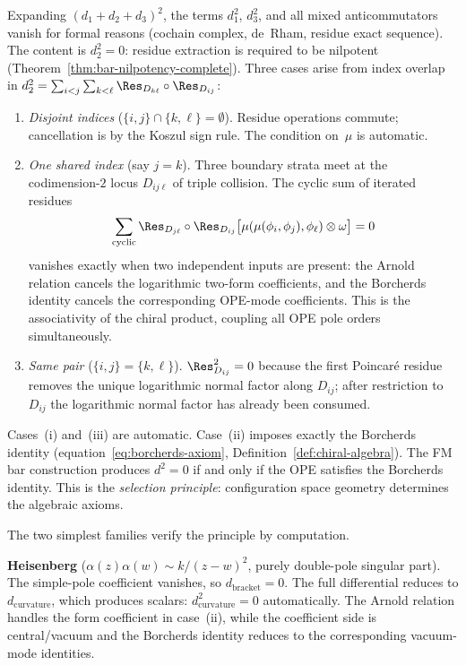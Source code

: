 \noindent
Expanding $(d_1 + d_2 + d_3)^2$, the terms
$d_1^2$, $d_3^2$, and all mixed anticommutators vanish
for formal reasons (cochain complex, de~Rham,
residue exact sequence). The content is
$d_2^2 = 0$: residue extraction is required to be nilpotent
(Theorem~\ref{thm:bar-nilpotency-complete}).
Three cases arise from index overlap in
$d_2^2 = \sum_{i<j}\sum_{k<\ell}
\Res_{D_{k\ell}} \circ \Res_{D_{ij}}$:
\begin{enumerate}[label=\textup{(\roman*)}]
\item \emph{Disjoint indices}
 ($\{i,j\} \cap \{k,\ell\} = \emptyset$).
 Residue operations commute; cancellation is by the
 Koszul sign rule. The condition on~$\mu$ is automatic.

\item \emph{One shared index} (say $j = k$).
 Three boundary strata meet at the codimension-$2$ locus
 $D_{ij\ell}$ of triple collision. The cyclic sum of
 iterated residues
 \[
 \sum_{\textup{cyclic}}
 \Res_{D_{j\ell}} \circ \Res_{D_{ij}}
 \bigl[\mu(\mu(\phi_i, \phi_j), \phi_\ell)
 \otimes \omega\bigr]
 = 0
 \]
 vanishes exactly when two independent inputs are present: the Arnold
 relation cancels the logarithmic two-form coefficients, and the
 Borcherds identity cancels the corresponding OPE-mode coefficients.
 This is the associativity of the chiral product, coupling all OPE pole
 orders simultaneously.

\item \emph{Same pair}
 ($\{i,j\} = \{k,\ell\}$).
 $\Res_{D_{ij}}^2 = 0$ because the first Poincar\'e residue removes the
 unique logarithmic normal factor along \(D_{ij}\); after restriction to
 \(D_{ij}\) the logarithmic normal factor has already been consumed.
\end{enumerate}
Cases~(i) and~(iii) are automatic.
Case~(ii) imposes exactly the Borcherds identity
(equation~\eqref{eq:borcherds-axiom},
Definition~\ref{def:chiral-algebra}).
The FM bar
construction produces $d^2 = 0$ if and only if the OPE
satisfies the Borcherds identity. This is the \emph{selection principle}:
configuration space geometry determines the algebraic axioms.

The two simplest families verify the principle by computation.

\smallskip\noindent\textbf{Heisenberg} ($\alpha(z)\alpha(w) \sim
k/(z-w)^2$, purely double-pole singular part). The simple-pole
coefficient vanishes, so
$d_{\mathrm{bracket}} = 0$. The full differential reduces to
$d_{\mathrm{curvature}}$, which produces scalars:
$d_{\mathrm{curvature}}^2 = 0$ automatically. The Arnold
relation handles the form coefficient in case~(ii), while the
coefficient side is central/vacuum and the Borcherds identity reduces to
the corresponding vacuum-mode identities.


